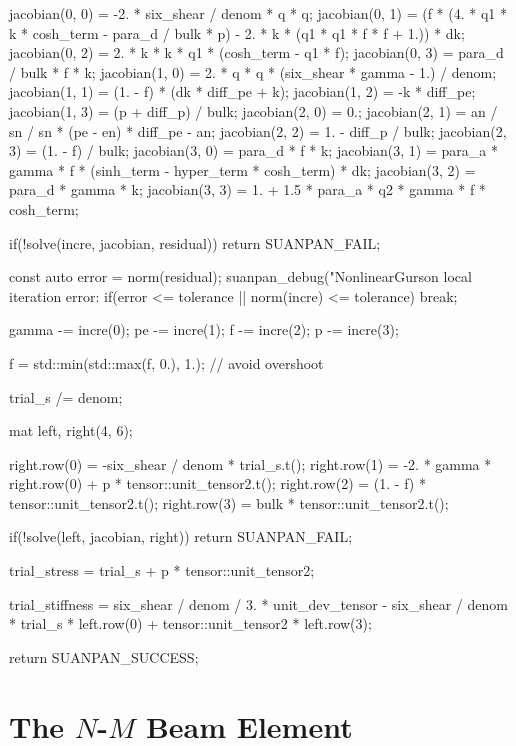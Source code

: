 \begin{cppcode}
{{        jacobian(0, 0) = -2. * six_shear / denom * q * q;
        jacobian(0, 1) = (f * (4. * q1 * k * cosh_term - para_d / bulk * p) - 2. * k * (q1 * q1 * f * f + 1.)) * dk;
        jacobian(0, 2) = 2. * k * k * q1 * (cosh_term - q1 * f);
        jacobian(0, 3) = para_d / bulk * f * k;
        jacobian(1, 0) = 2. * q * q * (six_shear * gamma - 1.) / denom;
        jacobian(1, 1) = (1. - f) * (dk * diff_pe + k);
        jacobian(1, 2) = -k * diff_pe;
        jacobian(1, 3) = (p + diff_p) / bulk;
        jacobian(2, 0) = 0.;
        jacobian(2, 1) = an / sn / sn * (pe - en) * diff_pe - an;
        jacobian(2, 2) = 1. - diff_p / bulk;
        jacobian(2, 3) = (1. - f) / bulk;
        jacobian(3, 0) = para_d * f * k;
        jacobian(3, 1) = para_a * gamma * f * (sinh_term - hyper_term * cosh_term) * dk;
        jacobian(3, 2) = para_d * gamma * k;
        jacobian(3, 3) = 1. + 1.5 * para_a * q2 * gamma * f * cosh_term;

        if(!solve(incre, jacobian, residual)) return SUANPAN_FAIL;

        const auto error = norm(residual);
        suanpan_debug("NonlinearGurson local iteration error: %
        if(error <= tolerance || norm(incre) <= tolerance) break;

        gamma -= incre(0);
        pe -= incre(1);
        f -= incre(2);
        p -= incre(3);

        f = std::min(std::max(f, 0.), 1.); // avoid overshoot
    }

    trial_s /= denom;

    mat left, right(4, 6);

    right.row(0) = -six_shear / denom * trial_s.t();
    right.row(1) = -2. * gamma * right.row(0) + p * tensor::unit_tensor2.t();
    right.row(2) = (1. - f) * tensor::unit_tensor2.t();
    right.row(3) = bulk * tensor::unit_tensor2.t();

    if(!solve(left, jacobian, right)) return SUANPAN_FAIL;

    trial_stress = trial_s + p * tensor::unit_tensor2;

    trial_stiffness = six_shear / denom / 3. * unit_dev_tensor - six_shear / denom * trial_s * left.row(0) + tensor::unit_tensor2 * left.row(3);

    return SUANPAN_SUCCESS;
}
\end{cppcode}
\section{The $N$-$M$ Beam Element}
